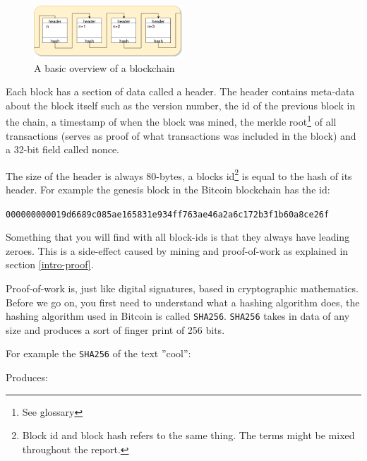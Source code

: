 \begin{figure}[H]
	\centering
	\includegraphics[width=0.5\textwidth]{introduction/images/blockchain.png}
	\caption{A basic overview of a blockchain}
	\label{fig:blockchain}
\end{figure}

Each block has a section of data called a header. The header contains meta-data 
about the block itself such as the version number, the id of the previous block 
in the chain, a timestamp of when the block was mined, the merkle root\footnote{See glossary} of 
all transactions (serves as proof of what transactions was included in the block) 
and a 32-bit field called nonce. 

The size of the header is always 80-bytes, a blocks id\footnote{Block id and 
block hash refers to the same thing. The terms might be mixed throughout the report.} 
is equal to the hash of its header. For example the genesis block in the 
Bitcoin blockchain has the id:

\texttt{000000000019d6689c085ae165831e934ff763ae46a2a6c172b3f1b60a8ce26f}

Something that you will find with all block-ids is that they always have leading zeroes. 
This is a side-effect  caused by mining and proof-of-work as explained in section \ref{intro-proof}.

\label{intro-proof}
Proof-of-work is, just like digital signatures, based in cryptographic
mathematics. Before we go on, you first need to understand what a hashing
algorithm does, the hashing algorithm used in Bitcoin is called \texttt{SHA256}.
\texttt{SHA256} takes in data of any size and produces a sort of finger print
of 256 bits.

For example the \texttt{SHA256} of the text ''cool'':


Produces:


